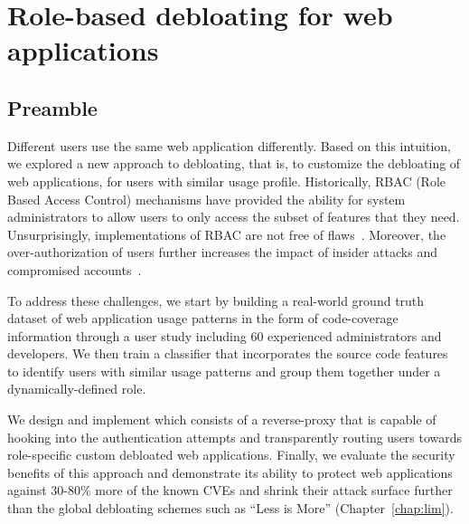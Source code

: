 \chapter{Role-based debloating for web applications}
\label{chap:dbltr}

\section*{Preamble}
Different users use the same web application differently. 
Based on this intuition, we explored a new approach to debloating, that is, to customize the debloating of web applications, for users with similar usage profile. 
Historically, RBAC (Role Based Access Control) mechanisms have provided the ability for system administrators to allow users to only access the subset of features that they need. 
Unsurprisingly, implementations of RBAC are not free of flaws~\cite{doupe2011fear, dalton2009nemesis, wpfilemanager}. 
Moreover, the over-authorization of users further increases the impact of insider attacks and compromised accounts~\cite{twitterviphack, oktahack}.

To address these challenges, we start by building a real-world ground truth dataset of web application usage patterns in the form of code-coverage information through a user study including 60 experienced administrators and developers. 
We then train a classifier that incorporates the source code features to identify users with similar usage patterns and group them together under a dynamically-defined role. 

We design and implement \dbltr{} which consists of a reverse-proxy that is capable of hooking into the authentication attempts and transparently routing users towards role-specific custom debloated web applications. 
Finally, we evaluate the security benefits of this approach and demonstrate its ability to protect web applications against 30-80\% more of the known CVEs and shrink their attack surface further than the global debloating schemes such as ``Less is More'' (Chapter~\ref{chap:lim}). 







